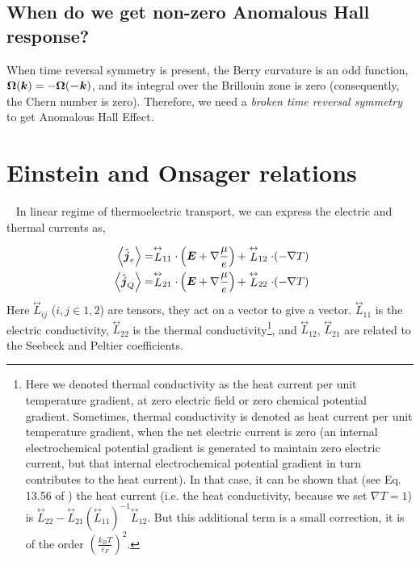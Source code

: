 \documentclass{report}
\renewcommand\vec[1]{\ensuremath\boldsymbol{#1}} %
\begin{document}
\subsection{When do we get non-zero Anomalous Hall response?}
When time reversal symmetry is present, the Berry curvature is an odd function, $\vec{\Omega}(\vec{k}) = - \vec{\Omega}(\vec{-k})$, and its integral over the Brillouin zone is zero (consequently, the Chern number is zero).
Therefore, we need a \textit{broken time reversal symmetry} to get Anomalous Hall Effect.


\section{Einstein and Onsager relations}~\label{sec:Einstein-Onsager}
In linear regime of thermoelectric transport, we 
can express the electric and thermal currents as,

\begin{equation}~\label{Eq:TrasportCoeffs}
	\begin{aligned}
		\expval{\hat{\vec{j}}_e} &= \stackrel{\leftrightarrow}{L}_{11} \cdot \left(\vec{E} + \nabla \frac{\mu}{e}\right) + \stackrel{\leftrightarrow}{L}_{12} \cdot (-\nabla{T})  \\
		\expval{\hat{\vec{j}}_Q} &= \stackrel{\leftrightarrow}{L}_{21} \cdot \left(\vec{E} + \nabla \frac{\mu}{e}\right)  + \stackrel{\leftrightarrow}{L}_{22} \cdot (-\nabla{T}) 
	\end{aligned}
\end{equation}
Here $\stackrel{\leftrightarrow}{L}_{i j}$ ($i,j \in {1,2}$) are tensors, they act on a vector to give a vector. $\stackrel{\leftrightarrow}{L}_{1 1}$ is the electric conductivity, $\stackrel{\leftrightarrow}{L}_{2 2}$ is the thermal conductivity\footnote{Here we denoted thermal conductivity as the heat current per unit temperature gradient, at zero electric field or zero chemical potential gradient. Sometimes, thermal conductivity is denoted as heat current per unit temperature gradient, when the net electric current is zero (an internal electrochemical potential gradient is generated to maintain zero electric current, but that internal electrochemical potential gradient in turn contributes to the heat current). In that case, it can be shown that (see Eq. 13.56 of \cite{book:AshcroftMermin76}) the heat current (i.e. the heat conductivity, because we set $\nabla T = 1$) is $\stackrel{\leftrightarrow}{L}_{22} - \stackrel{\leftrightarrow}{L}_{21} (\stackrel{\leftrightarrow}{L}_{11})^{-1} \stackrel{\leftrightarrow}{L}_{12}$. But this additional term is a small correction, it is of the order $\left(\frac{k_B T}{\varepsilon_F}\right)^2$.}, and $\stackrel{\leftrightarrow}{L}_{1 2}$, $\stackrel{\leftrightarrow}{L}_{2 1}$ are related to the Seebeck and Peltier coefficients.
\end{document}
